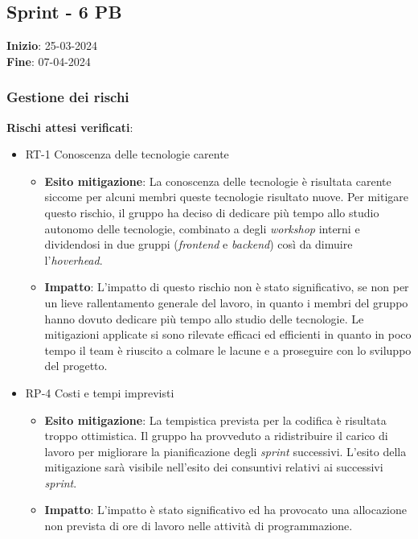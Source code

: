 \subsection{Sprint - 6 PB}
\textbf{Inizio}: 25-03-2024 \\
\textbf{Fine}: 07-04-2024

\subsubsection{Gestione dei rischi}
\textbf{Rischi attesi verificati}:

\begin{itemize}
	\item RT-1 Conoscenza delle tecnologie carente
	      \begin{itemize}
		      \item \textbf{Esito mitigazione}: La conoscenza delle tecnologie è risultata carente siccome per alcuni membri queste tecnologie risultato nuove.
		            Per mitigare questo rischio, il gruppo ha deciso di dedicare più tempo allo studio autonomo delle tecnologie, combinato a degli \textit{workshop} interni e dividendosi in due gruppi (\textit{frontend} e \textit{backend}) così da dimuire l'\textit{hoverhead}.
		      \item \textbf{Impatto}: L'impatto di questo rischio non è stato significativo, se non per un lieve rallentamento generale del lavoro, in quanto i membri del gruppo hanno dovuto dedicare più tempo allo studio delle tecnologie.
		            Le mitigazioni applicate si sono rilevate efficaci ed efficienti in quanto in poco tempo il team è riuscito a colmare le lacune e a proseguire con lo sviluppo del progetto.
	      \end{itemize}
	\item RP-4 Costi e tempi imprevisti
	      \begin{itemize}
		      \item \textbf{Esito mitigazione}: La tempistica prevista per la codifica è risultata troppo ottimistica. Il gruppo ha provveduto a ridistribuire il carico di lavoro per migliorare la pianificazione degli \textit{sprint} successivi. L'esito della mitigazione sarà visibile nell'esito dei consuntivi relativi ai successivi \textit{sprint}.
		      \item  \textbf{Impatto}: L'impatto è stato significativo ed ha provocato una allocazione non prevista di ore di lavoro nelle attività di programmazione.
	      \end{itemize}
\end{itemize}


